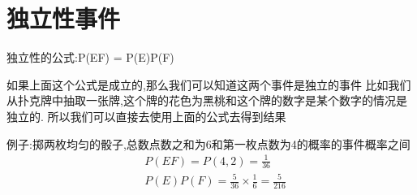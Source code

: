 \documentclass[UTF8]{ctexart}
\begin{document}
\section{独立性事件}
独立性的公式:P(EF) = P(E)P(F)
\par 
如果上面这个公式是成立的,那么我们可以知道这两个事件是独立的事件
比如我们从扑克牌中抽取一张牌,这个牌的花色为黑桃和这个牌的数字是某个数字的情况是独立的.
所以我们可以直接去使用上面的公式去得到结果

\par 
例子:掷两枚均匀的骰子,总数点数之和为6和第一枚点数为4的概率的事件概率之间
\begin{equation}
    \begin{aligned}
        &P(E F) = P({4,2}) = \frac{1}{36}\\ \nonumber
        &P(E)P(F) = \frac{5}{36}\times\frac{1}{6} = \frac{5}{216}
    \end{aligned}
\end{equation}
\end{document}
